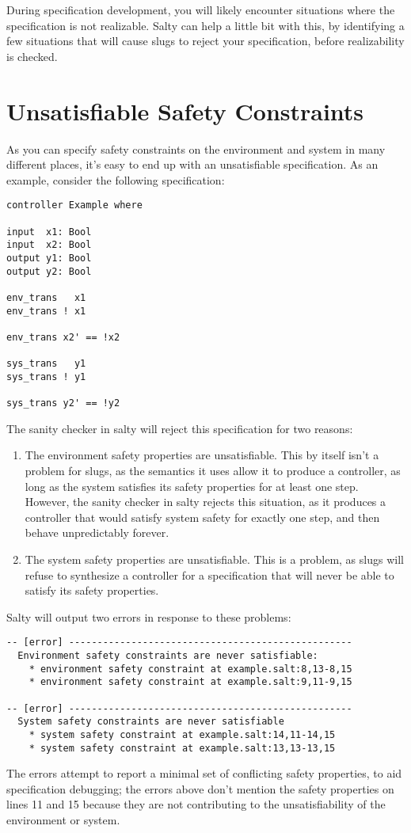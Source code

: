 During specification development, you will likely encounter situations where the 
specification is not realizable. Salty can help a little bit with this, 
by identifying a few situations that will cause slugs to reject your specification, 
before realizability is checked.

\section{Unsatisfiable Safety Constraints}

As you can specify safety constraints on the environment and system in 
many different places, it's easy to end up with an unsatisfiable specification. 
As an example, consider the following specification:

\begin{lstlisting}
controller Example where

input  x1: Bool
input  x2: Bool
output y1: Bool
output y2: Bool

env_trans   x1
env_trans ! x1

env_trans x2' == !x2

sys_trans   y1
sys_trans ! y1

sys_trans y2' == !y2
\end{lstlisting}
The sanity checker in salty will reject this specification for two reasons:
\begin{enumerate}
 \item The environment safety properties are unsatisfiable. This by itself isn't a problem 
for slugs, as the semantics it uses allow it to produce a controller, as long as the 
system satisfies its safety properties for at least one step. However, the sanity 
checker in salty rejects this situation, as it produces a controller that would 
satisfy system safety for exactly one step, and then behave unpredictably forever.
 \item The system safety properties are unsatisfiable. This is a problem, as slugs will 
refuse to synthesize a controller for a specification that will never be able to 
satisfy its safety properties.
\end{enumerate}

Salty will output two errors in response to these problems:
\begin{lstlisting}
-- [error] --------------------------------------------------
  Environment safety constraints are never satisfiable:
    * environment safety constraint at example.salt:8,13-8,15
    * environment safety constraint at example.salt:9,11-9,15

-- [error] --------------------------------------------------
  System safety constraints are never satisfiable
    * system safety constraint at example.salt:14,11-14,15
    * system safety constraint at example.salt:13,13-13,15
\end{lstlisting}
The errors attempt to report a minimal set of conflicting safety properties, 
to aid specification debugging; the errors above don't mention the safety properties 
on lines 11 and 15 because they are not contributing to the unsatisfiability of 
the environment or system.

